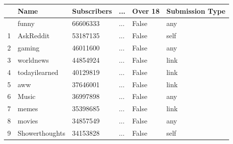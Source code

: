 \documentclass[
  12pt,
  letterpaper,
  DIV=11,
  numbers=noendperiod,
  abstract]{scrartcl}
\begin{document}
\begin{longtable}[]{@{}llllll@{}}
\toprule\noalign{}
& Name & Subscribers & ... & Over 18 & Submission Type \\
\midrule\noalign{}
\endhead
\bottomrule\noalign{}
\endlastfoot
0 & funny & 66606333 & ... & False & any \\
1 & AskReddit & 53187135 & ... & False & self \\
2 & gaming & 46011600 & ... & False & any \\
3 & worldnews & 44854924 & ... & False & link \\
4 & todayilearned & 40129819 & ... & False & link \\
5 & aww & 37646001 & ... & False & link \\
6 & Music & 36997898 & ... & False & any \\
7 & memes & 35398685 & ... & False & link \\
8 & movies & 34857549 & ... & False & any \\
9 & Showerthoughts & 34153828 & ... & False & self \\
\end{longtable}
\end{document}
